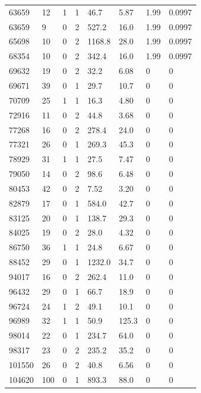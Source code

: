 \documentclass[preview]{standalone}
\begin{document}
{{{\begin{tabular}{L{1.2cm}C{1.2cm} C{0.3cm}C{0.5cm} C{1.4cm}C{1.4cm} C{1.4cm}C{1.4cm}}
  63659  &    12  & 1     &  1 &  46.7  & 5.87  & 1.99 &  0.0997   \\ 
  63659  &     9  & 0     &  2 &  527.2  & 16.0  & 1.99 &  0.0997   \\ 
  65698  &    10  & 0     &  2 &  1168.8  & 28.0  & 1.99 &  0.0997   \\ 
  68354  &    10  & 0     &  2 &  342.4  & 16.0  & 1.99 &  0.0997   \\ 
  69632  &    19  & 0     &  2 &  32.2  & 6.08  & 0 &  0   \\ 
  69671  &    39  & 0     &  1 &  29.7  & 10.7  & 0 &  0   \\ 
  70709  &    25  & 1     &  1 &  16.3  & 4.80  & 0 &  0   \\ 
  72916  &    11  & 0     &  2 &  44.8  & 3.68  & 0 &  0   \\ 
  77268  &    16  & 0     &  2 &  278.4  & 24.0  & 0 &  0   \\ 
  77321  &    26  & 0     &  1 &  269.3  & 45.3  & 0 &  0   \\ 
  78929  &    31  & 1     &  1 &  27.5  & 7.47  & 0 &  0   \\ 
  79050  &    14  & 0     &  2 &  98.6  & 6.48  & 0 &  0   \\ 
  80453  &    42  & 0     &  2 &  7.52  & 3.20  & 0 &  0   \\ 
  82879  &    17  & 0     &  1 &  584.0  & 42.7  & 0 &  0   \\ 
  83125  &    20  & 0     &  1 &  138.7  & 29.3  & 0 &  0   \\ 
  84025  &    19  & 0     &  2 &  28.0  & 4.32  & 0 &  0   \\ 
  86750  &    36  & 1     &  1 &  24.8  & 6.67  & 0 &  0   \\ 
  88452  &    29  & 0     &  1 &  1232.0  & 34.7  & 0 &  0   \\ 
  94017  &    16  & 0     &  2 &  262.4  & 11.0  & 0 &  0   \\ 
  96432  &    29  & 0     &  1 &  66.7  & 18.9  & 0 &  0   \\ 
  96724  &    24  & 1     &  2 &  49.1  & 10.1  & 0 &  0   \\ 
  96989  &    32  & 1     &  1 &  50.9  & 125.3  & 0 &  0   \\ 
  98014  &    22  & 0     &  1 &  234.7  & 64.0  & 0 &  0   \\ 
  98317  &    23  & 0     &  2 &  235.2  & 35.2  & 0 &  0   \\ 
  101550  &    26  & 0     &  2 &  40.8  & 6.56  & 0 &  0   \\ 
  104620  &   100  & 0     &  1 &  893.3  & 88.0  & 0 &  0   \\ 
\hline 
\end{tabular} 

}}}
\end{document}
